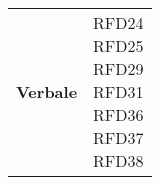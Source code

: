 \begin{longtable}[H]{| >{\centering\bfseries}p{8cm} | >{\centering\arraybackslash}p{8cm} |}
    Verbale & 
        \makecell{
            RFD24 \\
            RFD25 \\
            RFD29 \\
            RFD31 \\
            RFD36 \\
            RFD37 \\
            RFD38
        } \\

\end{longtable}